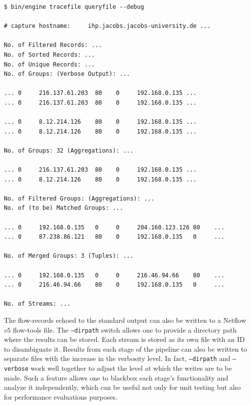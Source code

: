 
\begin{lstlisting}
$ bin/engine tracefile queryfile --debug

# capture hostname:     ihp.jacobs.jacobs-university.de ...

No. of Filtered Records: ...
No. of Sorted Records: ...
No. of Unique Records: ...
No. of Groups: (Verbose Output): ...

... 0     216.137.61.203  80    0     192.168.0.135 ...
... 0     216.137.61.203  80    0     192.168.0.135 ...

... 0     8.12.214.126    80    0     192.168.0.135 ...
... 0     8.12.214.126    80    0     192.168.0.135 ...

No. of Groups: 32 (Aggregations): ...

... 0     216.137.61.203  80    0     192.168.0.135 ...
... 0     8.12.214.126    80    0     192.168.0.135 ...

No. of Filtered Groups: (Aggregations): ...
No. of (to be) Matched Groups: ...

... 0     192.168.0.135   0     0     204.160.123.126 80    ...
... 0     87.238.86.121   80    0     192.168.0.135   0     ...

No. of Merged Groups: 3 (Tuples): ...

... 0     192.168.0.135   0     0     216.46.94.66    80    ...
... 0     216.46.94.66    80    0     192.168.0.135   0     ...

No. of Streams: ...
\end{lstlisting}

The flow-records echoed to the standard output can also be written to a
Netflow $v5$ flow-tools file. The \texttt{--dirpath} switch allows one to
provide a directory path where the results can be stored.  Each stream is
stored as  its own file with an ID to
disambiguate it. Results from each stage of the pipeline can also be written
to separate files with the increase in the verbosity level. In fact,
\texttt{--dirpath} and \texttt{--verbose} work well together to adjust the
level at which the writes are to be made. Such a feature allows one to
blackbox each stage's functionality and analyze it independently, which can be
useful not only for unit testing but also for performance evaluations
purposes.


